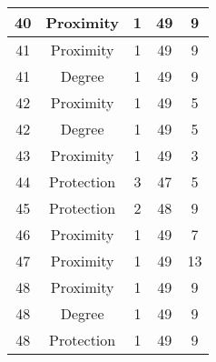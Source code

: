\documentclass[results.tex]{subfiles}
\begin{document}
\begin{center}
\begin{tabular}{| c || c | c | c | c |}
            \hline
            40                      & Proximity                    & 1                      & 49                      & 9                    \\
            \hline
            41                      & Proximity                    & 1                      & 49                      & 9                    \\
            \hline
            41                      & Degree                       & 1                      & 49                      & 9                    \\
            \hline
            42                      & Proximity                    & 1                      & 49                      & 5                    \\
            \hline
            42                      & Degree                       & 1                      & 49                      & 5                    \\
            \hline
            43                      & Proximity                    & 1                      & 49                      & 3                    \\
            \hline
            44                      & Protection                   & 3                      & 47                      & 5                    \\
            \hline
            45                      & Protection                   & 2                      & 48                      & 9                    \\
            \hline
            46                      & Proximity                    & 1                      & 49                      & 7                    \\
            \hline
            47                      & Proximity                    & 1                      & 49                      & 13                   \\
            \hline
            48                      & Proximity                    & 1                      & 49                      & 9                    \\
            \hline
            48                      & Degree                       & 1                      & 49                      & 9                    \\
            \hline
            48                      & Protection                   & 1                      & 49                      & 9                    \\

\end{tabular}
\end{center}
\end{document}
